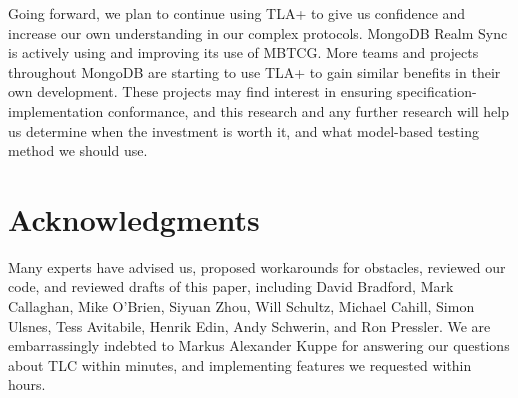 \documentclass{vldb}
\begin{document}
Going forward, we plan to continue using TLA+ to give us confidence and increase our own understanding in our complex protocols.
MongoDB Realm Sync is actively using and improving its use of MBTCG.
More teams and projects throughout MongoDB are starting to use TLA+ to gain similar benefits in their own development.
These projects may find interest in ensuring specification-implementation conformance, and this research and any further research will help us determine when the investment is worth it, and what model-based testing method we should use.


\section{Acknowledgments}
\label{sec:acknowledgments}
Many experts have advised us, proposed workarounds for obstacles, reviewed our code, and reviewed drafts of this paper, including 
David Bradford,
Mark Callaghan,
Mike O'Brien,
Siyuan Zhou,
Will Schultz,
Michael Cahill,
Simon Ulsnes,
Tess Avitabile,
Henrik Edin,
Andy Schwerin,
and Ron Pressler.
We are embarrassingly indebted to Markus Alexander Kuppe for answering our questions about TLC within minutes, and implementing features we requested within hours.


\end{document}
